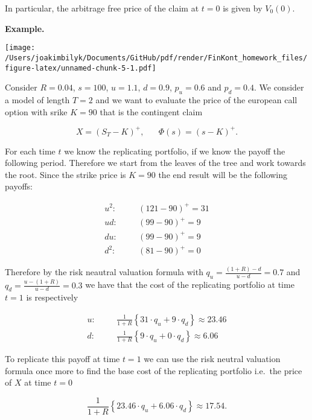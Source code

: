 \documentclass[
]{article}
\begin{document}
In particular, the arbitrage free price of the claim at \(t=0\) is given
by \(V_0(0)\).

\textbf{Example.}

\texttt{[image: /Users/joakimbilyk/Documents/GitHub/pdf/render/FinKont\_homework\_files/figure-latex/unnamed-chunk-5-1.pdf]}

Consider \(R=0.04\), \(s=100\), \(u=1.1\), \(d=0.9\), \(p_u=0.6\) and
\(p_d=0.4\). We consider a model of length \(T=2\) and we want to
evaluate the price of the european call option with srike \(K=90\) that
is the contingent claim

\[
X=(S_T-K)^+,\hspace{20pt}\Phi(s)=(s-K)^+.
\]

For each time \(t\) we know the replicating portfolio, if we know the
payoff the following period. Therefore we start from the leaves of the
tree and work towards the root. Since the strike price is \(K=90\) the
end result will be the following payoffs:

\begin{align*}
u^2:\hspace{20pt}&(121-90)^+=31\\
ud:\hspace{20pt}&(99-90)^+=9\\
du:\hspace{20pt}&(99-90)^+=9\\
d^2:\hspace{20pt}&(81-90)^+=0
\end{align*}

Therefore by the risk neautral valuation formula with
\(q_u=\frac{(1+R)-d}{u-d}=0.7\) and \(q_d=\frac{u-(1+R)}{u-d}=0.3\) we
have that the cost of the replicating portfolio at time \(t=1\) is
respectively

\begin{align*}
u:\hspace{20pt}&\frac{1}{1+R}\left\{31\cdot q_u + 9 \cdot q_d\right\}\approx 23.46\\
d:\hspace{20pt}&\frac{1}{1+R}\left\{9\cdot q_u + 0 \cdot q_d\right\}\approx 6.06
\end{align*}

To replicate this payoff at time \(t=1\) we can use the risk neutral
valuation formula once more to find the base cost of the replicating
portfolio i.e.~the price of \(X\) at time \(t=0\)

\[
\frac{1}{1+R}\left\{23.46\cdot q_u + 6.06 \cdot q_d\right\}\approx 17.54.
\]
\end{document}
